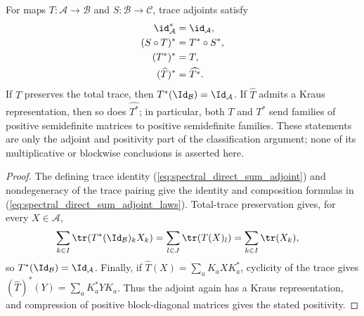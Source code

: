 \begin{lemma}%
    \label{lem:direct_sum_rectangular_trace_adjoint}
    \leanok
    For maps $T:\mathcal A\to\mathcal B$ and
    $S:\mathcal B\to\mathcal C$, trace adjoints satisfy
    \begin{align}
        \id_{\mathcal A}^*
        &=\id_{\mathcal A}, \notag\\
        (S\circ T)^*
        &=T^*\circ S^*, \notag\\
        (T^*)^*
        &=T, \notag\\
        (\widehat T)^*
        &=\widehat{T^*}.
        \label{eq:spectral_direct_sum_adjoint_laws}
    \end{align}
    If $T$ preserves the total trace, then
    $T^*(\Id_{\mathcal B})=\Id_{\mathcal A}$. If $\widehat T$ admits a
    Kraus representation, then so does $\widehat{T^*}$; in particular, both
    $T$ and $T^*$ send families of positive semidefinite matrices to
    positive semidefinite families. These statements are only the adjoint
    and positivity part of the classification argument; none of its
    multiplicative or blockwise conclusions is asserted here.
\end{lemma}

\begin{proof}
    \leanok
    The defining trace identity
    (\ref{eq:spectral_direct_sum_adjoint}) and nondegeneracy of the trace
    pairing give the identity and composition formulas in
    (\ref{eq:spectral_direct_sum_adjoint_laws}). Total-trace preservation
    gives, for every $X\in\mathcal A$,
    \begin{align}
        \sum_{k\in I}\tr(T^*(\Id_{\mathcal B})_kX_k)
        &=\sum_{l\in J}\tr(T(X)_l)
          =\sum_{k\in I}\tr(X_k),
        \notag
    \end{align}
    so $T^*(\Id_{\mathcal B})=\Id_{\mathcal A}$. Finally, if
    $\widehat T(X)=\sum_aK_aXK_a^*$, cyclicity of the trace gives
    $(\widehat T)^*(Y)=\sum_aK_a^*YK_a$. Thus the adjoint again has a
    Kraus representation, and compression of positive block-diagonal
    matrices gives the stated positivity.
\end{proof}

